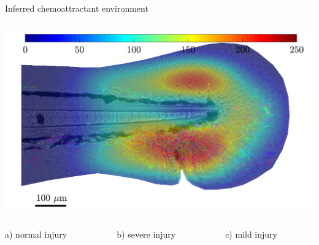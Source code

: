 \documentclass[mathserif,11pt]{beamer}
\begin{document}
\begin{frame}{Inferred chemoattractant environment}
\begin{columns}
\begin{column}{0.3\textwidth}
		\vspace{0.6cm}
		\includegraphics[scale=0.14]{Figures/nick4_field.png}
	\end{column}
\end{columns}
\begin{columns}
	\begin{column}{0.3\textwidth}
		\centering
		\footnotesize{ a) normal injury}
	\end{column}
	\begin{column}{0.3\textwidth}
		\centering
		\footnotesize{ b) severe injury}
	\end{column}
	\begin{column}{0.3\textwidth}
		\centering
		\footnotesize{ c) mild injury}
	\end{column}
\end{columns}
\end{frame}
\end{document}
